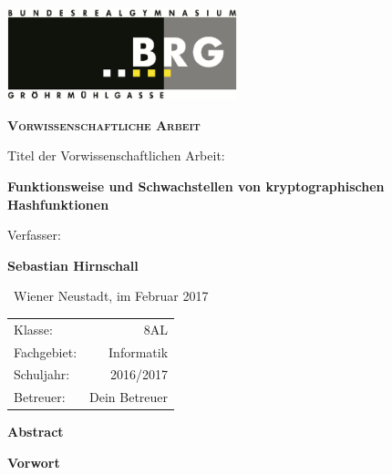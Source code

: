 \documentclass[12pt,a4paper]{scrartcl}
\begin{document}
\begin{titlepage}
	\centering
	\begin{flushright}
		\includegraphics[width=0.5\textwidth]{brgg-logo}\par\vspace{1cm}
	\end{flushright}	
		
	\vspace{4cm}
		
	{\scshape\huge \textbf{Vorwissenschaftliche Arbeit}\par}
	\vspace{1.5cm}
	Titel der Vorwissenschaftlichen Arbeit: \par
	\vspace{0.5cm}
	{\large\bfseries Funktionsweise und Schwachstellen von kryptographischen Hashfunktionen\par}
	\vspace{2cm}
	Verfasser: \par
	\vspace{0.3cm}
	{\Large \textbf{Sebastian Hirnschall}\par}
	\vfill
	\begin{flushleft}
		$ \, $ Wiener Neustadt, im Februar 2017 \par
		\begin{tabular}{l r}
			Klasse:     & 8AL           \\
			Fachgebiet: & Informatik    \\
			Schuljahr:  & 2016/2017     \\
			Betreuer:   & Dein Betreuer \\
		\end{tabular}
	\end{flushleft}
	
	
	
		
\end{titlepage}
\restoregeometry



\newpage
{\huge \bfseries Abstract}
\thispagestyle{firststyle}
	
\newpage
{\huge \bfseries Vorwort}
\thispagestyle{firststyle}
\end{document}
